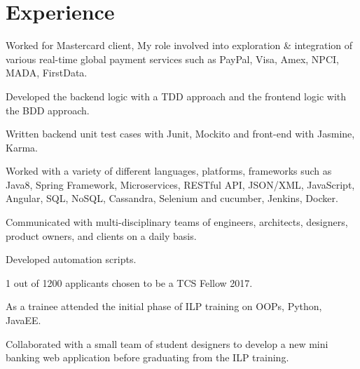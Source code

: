 \documentclass[]{kk-resume-openfont}
\begin{document}
\hfill
\begin{minipage}[t]{0.66\textwidth} 


\section{Experience}
\vspace{\topsep} %
\begin{tightemize}
\item Worked for Mastercard client, My role involved into exploration \& integration of various real-time global payment services such as PayPal, Visa, Amex, NPCI, MADA, FirstData.
\item Developed the backend logic with a TDD approach and the frontend logic with the BDD approach.
\item  Written backend unit test cases with Junit, Mockito and front-end with Jasmine, Karma.
\item Worked with a variety of different languages, platforms, frameworks such as Java8, Spring Framework, Microservices, RESTful API, JSON/XML, JavaScript, Angular, SQL, NoSQL, Cassandra, Selenium and cucumber, Jenkins, Docker.
\item Communicated with multi-disciplinary teams of engineers, architects, designers, product owners, and clients on a daily basis.
\item Developed automation scripts.
\end{tightemize}
\sectionsep

\begin{tightemize}
\item 1 out of 1200 applicants chosen to be a TCS Fellow 2017.
\item As a trainee attended the initial phase of ILP training on OOPs, Python, JavaEE.
\item Collaborated with a small team of student designers to develop a new mini banking web application before graduating from the ILP training.
\end{tightemize}
\sectionsep


\end{minipage}
\end{document}
